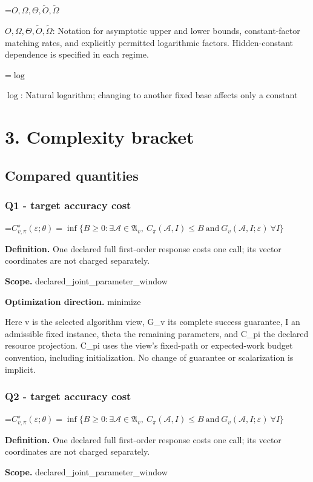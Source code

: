 \documentclass[10pt,a4paper]{article}
\newcommand{\AtlasMath}[1]{\par\begingroup\centering\setbox0=\hbox{$\displaystyle #1$}\ifdim\wd0>1.4\linewidth\typeout{ATLAS WIDE FORMULA: \the\wd0}\fi\ifdim\wd0>\linewidth\resizebox{\linewidth}{!}{\box0}\else\box0\fi\par\endgroup}
\newcommand{\AtlasInlineMath}[1]{\begingroup\setbox0=\hbox{$#1$}\ifdim\wd0>.4\linewidth\endgroup\AtlasMath{#1}\else\endgroup$#1$\fi}
\begin{document}
\AtlasInlineMath{O,\Omega,\Theta,\widetilde{O},\widetilde\Omega}: Notation for asymptotic upper and lower bounds, constant-factor matching rates, and explicitly permitted logarithmic factors. Hidden-constant dependence is specified in each regime.

\AtlasInlineMath{\log}: Natural logarithm; changing to another fixed base affects only a constant

\section{3. Complexity bracket}
\subsection{Compared quantities}
\subsubsection{Q1 - target accuracy cost}
\AtlasMath{C^\star_{v,\pi}(\varepsilon;\theta)=\inf\{B\ge0:\exists\mathcal A\in\mathfrak A_v,\ C_\pi(\mathcal A,I)\le B\ \text{and}\ G_v(\mathcal A,I;\varepsilon)\ \forall I\}}
\textbf{Definition.} One declared full first-order response costs one call; its vector coordinates are not charged separately.

\textbf{Scope.} declared\_joint\_parameter\_window

\textbf{Optimization direction.} minimize

Here v is the selected algorithm view, G\_v its complete success guarantee, I an admissible fixed instance, theta the remaining parameters, and C\_pi the declared resource projection. C\_pi uses the view's fixed-path or expected-work budget convention, including initialization. No change of guarantee or scalarization is implicit.

\subsubsection{Q2 - target accuracy cost}
\AtlasMath{C^\star_{v,\pi}(\varepsilon;\theta)=\inf\{B\ge0:\exists\mathcal A\in\mathfrak A_v,\ C_\pi(\mathcal A,I)\le B\ \text{and}\ G_v(\mathcal A,I;\varepsilon)\ \forall I\}}
\textbf{Definition.} One declared full first-order response costs one call; its vector coordinates are not charged separately.

\textbf{Scope.} declared\_joint\_parameter\_window
\end{document}
